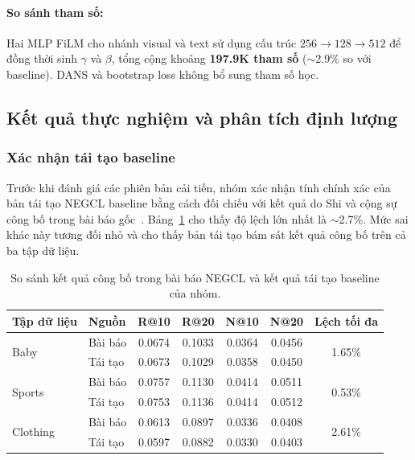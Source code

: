 \paragraph{So sánh tham số:}
Hai MLP FiLM cho nhánh visual và text sử dụng cấu trúc $256\rightarrow128\rightarrow512$ để đồng thời sinh $\gamma$ và $\beta$, tổng cộng khoảng \textbf{197.9K tham số} ($\sim$2.9\% so với baseline). DANS và bootstrap loss không bổ sung tham số học.


\subsection{Kết quả thực nghiệm và phân tích định lượng}

\subsubsection{Xác nhận tái tạo baseline}

Trước khi đánh giá các phiên bản cải tiến, nhóm xác nhận tính chính xác của bản tái tạo NEGCL baseline bằng cách đối chiếu với kết quả do Shi và cộng sự công bố trong bài báo gốc~\cite{shi2025negcl}. Bảng~\ref{tab:negcl_paper_vs_baseline} cho thấy độ lệch lớn nhất là $\sim$2.7\%. Mức sai khác này tương đối nhỏ và cho thấy bản tái tạo bám sát kết quả công bố trên cả ba tập dữ liệu.

\begingroup
\fontsize{8.5}{10}\selectfont
\setlength{\tabcolsep}{3pt}
\renewcommand{\arraystretch}{1.15}
\begin{table}[H]
\centering
\caption{So sánh kết quả công bố trong bài báo NEGCL và kết quả tái tạo baseline của nhóm.}
\label{tab:negcl_paper_vs_baseline}
\begin{tabular}{l l *{4}{c} c}
\toprule
\rowcolor{gray!15}
\textbf{Tập dữ liệu} & \textbf{Nguồn} & \textbf{R@10} & \textbf{R@20} & \textbf{N@10} & \textbf{N@20} & \textbf{Lệch tối đa} \\
\midrule
\multirow{2}{*}{Baby}
 & Bài báo   & 0.0674 & 0.1033 & 0.0364 & 0.0456 & \multirow{2}{*}{1.65\%} \\
 & Tái tạo   & 0.0673 & 0.1029 & 0.0358 & 0.0450 & \\
\midrule
\multirow{2}{*}{Sports}
 & Bài báo   & 0.0757 & 0.1130 & 0.0414 & 0.0511 & \multirow{2}{*}{0.53\%} \\
 & Tái tạo   & 0.0753 & 0.1136 & 0.0414 & 0.0512 & \\
\midrule
\multirow{2}{*}{Clothing}
 & Bài báo   & 0.0613 & 0.0897 & 0.0336 & 0.0408 & \multirow{2}{*}{2.61\%} \\
 & Tái tạo   & 0.0597 & 0.0882 & 0.0330 & 0.0403 & \\
\bottomrule
\end{tabular}
\end{table}
\endgroup


